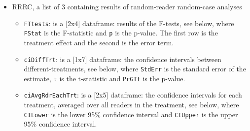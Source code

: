 \documentclass[
]{book}
\newenvironment{Shaded}{\begin{snugshade}}{\end{snugshade}}
\newcommand{\CommentTok}[1]{\textcolor[rgb]{0.56,0.35,0.01}{\textit{#1}}}
\newcommand{\NormalTok}[1]{#1}
\newcommand{\OperatorTok}[1]{\textcolor[rgb]{0.81,0.36,0.00}{\textbf{#1}}}
\providecommand{\tightlist}{%
  \setlength{\itemsep}{0pt}\setlength{\parskip}{0pt}}
\begin{document}
\begin{itemize}
\tightlist
\item
  RRRC, a list of 3 containing results of random-reader random-case analyses

  \begin{itemize}
  \tightlist
  \item
    \texttt{FTtests}: is a {[}2x4{]} dataframe: results of the F-tests, see below, where \texttt{FStat} is the F-statistic and \texttt{p} is the p-value. The first row is the treatment effect and the second is the error term.
  \item
    \texttt{ciDiffTrt}: is a {[}1x7{]} dataframe: the confidence intervals between different-treatments, see below, where \texttt{StdErr} is the standard error of the estimate, \texttt{t} is the t-statistic and \texttt{PrGTt} is the p-value.
  \item
    \texttt{ciAvgRdrEachTrt}: is a {[}2x5{]} dataframe: the confidence intervals for each treatment, averaged over all readers in the treatment, see below, where \texttt{CILower} is the lower 95\% confidence interval and \texttt{CIUpper} is the upper 95\% confidence interval.
  \end{itemize}
\end{itemize}

\begin{Shaded}
\end{Shaded}
\end{document}
